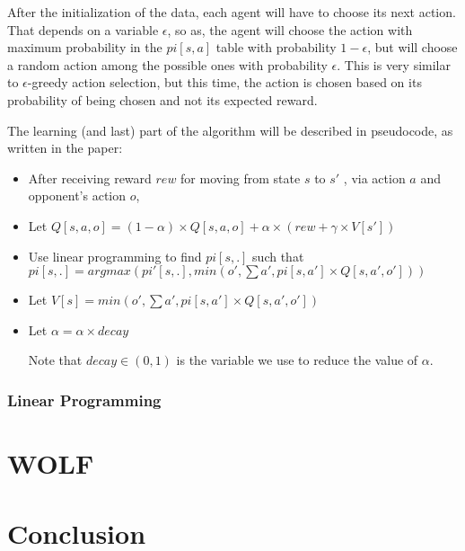 \documentclass[a4paper,11pt]{article}
\begin{document}
After the initialization of the data, each agent will have to choose its next action. That depends on a variable $\epsilon$, so as, the agent will choose the action with maximum probability in the $pi[s,a]$ table with probability $1-\epsilon$, but will choose a random action among the possible ones with probability $\epsilon$. This is very similar to $\epsilon$-greedy action selection, but this time, the action is chosen based on its probability of being chosen and not its expected reward.

The learning (and last) part of the algorithm will be described in pseudocode, as written in the paper:

\begin{itemize}
\item After receiving reward $rew$ for moving from state $s$ to $s'$ , via action $a$ and opponent's action $o$,

\item Let $Q[s,a,o] = (1-\alpha)\times Q[s,a,o] + \alpha \times (rew+ \gamma \times V[s'])$

\item Use linear programming to find $pi[s,.]$ such that $pi[s,.] = argmax { (pi'[s,.], min (o', \sum{a', pi[s,a'] \times Q[s,a',o']}))}$ 

\item Let $V[s] = min( o', \sum{a', pi[s,a'] \times Q[s,a',o']})$

\item Let $\alpha = \alpha \times decay$

Note that $decay \in (0,1)$ is the variable we use to reduce the value of $\alpha$. 

\end{itemize}


\subsubsection*{Linear Programming}










\section*{WOLF}


\section{Conclusion}
\end{document}
